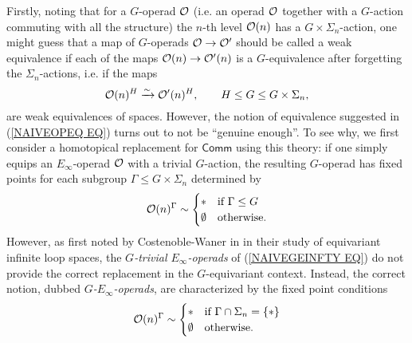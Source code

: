 \documentclass[a4paper,10pt]{article}%
\begin{document}
Firstly, noting that for a $G$-operad $\mathcal{O}$ (i.e. an operad $\mathcal{O}$ together with a $G$-action commuting with all the structure)
the $n$-th level $\mathcal{O}(n)$ has a $G \times \Sigma_n$-action,
one might guess that a map of $G$-operads
$\mathcal{O} \to \mathcal{O}'$
should be called a weak equivalence if each of the maps
$\mathcal{O}(n) \to \mathcal{O}'(n)$
is a $G$-equivalence after forgetting the $\Sigma_n$-actions, 
i.e. if the maps
\begin{equation}\label{NAIVEOPEQ EQ}
	\mathcal{O}(n)^H \xrightarrow{\sim} \mathcal{O}'(n)^H, \qquad H \leq G \leq G\times \Sigma_n,
\end{equation}
are weak equivalences of spaces. 
However, the notion of equivalence suggested in (\ref{NAIVEOPEQ EQ}) turns out to not be ``genuine enough''.
To see why, we first consider a homotopical replacement for $\mathsf{Comm}$ using this theory: 
if one simply equips an $E_{\infty}$-operad $\mathcal{O}$ with a trivial $G$-action, the resulting $G$-operad has fixed points for each subgroup $\Gamma \leq G \times \Sigma_n$
determined by
\begin{equation}\label{NAIVEGEINFTY EQ}
	\O(n)^{\Gamma} \sim 
\begin{cases}
	\** & \text{if } \Gamma \leq G
\\
	\emptyset & \text{otherwise}.
\end{cases}
\end{equation}
However, as first noted by Costenoble-Waner in \cite{CW91} in their study of equivariant infinite loop spaces,
the \textit{$G$-trivial $E_\infty$-operads} of (\ref{NAIVEGEINFTY EQ}) do not provide 
the correct replacement in the $G$-equivariant context. Instead, %
the correct notion, dubbed \textit{$G$-$E_{\infty}$-operads}, are characterized by the fixed point conditions
\begin{equation}\label{GENGEINFTY EQ}
	\O(n)^{\Gamma} \sim 
\begin{cases}
	\** & \text{if } \Gamma \cap \Sigma_n = \{\**\}
\\
	\emptyset & \text{otherwise}.
\end{cases}
\end{equation}
\end{document}
